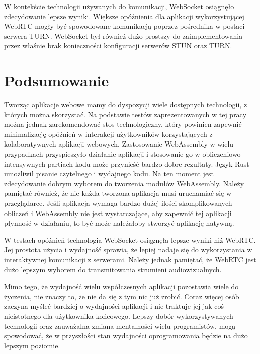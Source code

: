 \documentclass[language=polish,type=master]{aghmodern}
\begin{document}
W kontekście technologii używanych do komunikacji, WebSocket osiągnęło zdecydowanie lepsze wyniki.
Większe opóźnienia dla aplikacji wykorzystującej WebRTC mogły być spowodowane komunikacją poprzez pośrednika w postaci serwera TURN.
WebSocket był również dużo prostszy do zaimplementowania przez właśnie brak konieczności konfiguracji serwerów STUN oraz TURN.

\chapter{Podsumowanie}
Tworząc aplikacje webowe mamy do dyspozycji wiele dostępnych technologii, z których można skorzystać.
Na podstawie testów zaprezentowanych w tej pracy można jednak zarekomendować stos technologiczny, który powinien zapewnić minimalizację opóźnień w interakcji użytkowników korzystających z kolaboratywnych aplikacji webowych.
Zastosowanie WebAssembly w wielu przypadkach przyspieszyło działanie aplikacji i stosowanie go w obliczeniowo intensywnych partiach kodu może przynieść bardzo dobre rezultaty.
Język Rust umożliwił pisanie czytelnego i wydajnego kodu.
Na ten moment jest zdecydowanie dobrym wyborem do tworzenia modułów WebAssembly.
Należy pamiętać również, że nie każda tworzona aplikacja musi uruchamiać się w przeglądarce.
Jeśli aplikacja wymaga bardzo dużej ilości skomplikowanych obliczeń i WebAssembly nie jest wystarczające, aby zapewnić tej aplikacji płynność w działaniu, to być może należałoby stworzyć aplikację natywną.

W testach opóźnień technologia WebSocket osiągnęła lepsze wyniki niż WebRTC.
Jej prostota użycia i wydajność sprawia, że lepiej nadaje się do wykorzystania w interaktywnej komunikacji z serwerami.
Należy jednak pamiętać, że WebRTC jest dużo lepszym wyborem do transmitowania strumieni audiowizualnych.

Mimo tego, że wydajność wielu współczesnych aplikacji pozostawia wiele do życzenia, nie znaczy to, że nie da się z tym nic już zrobić.
Coraz więcej osób zaczyna myśleć bardziej o wydajności aplikacji i nie traktuje jej jak coś nieistotnego dla użytkownika końcowego.
Lepszy dobór wykorzystywanych technologii oraz zauważalna zmiana mentalności wielu programistów, mogą spowodować, że w przyszłości stan wydajności oprogramowania będzie na dużo lepszym poziomie.


\backmatter

\cleardoublepage
\renewcommand\listoflistingscaption{Spis listingów}
\listoflistings

\cleardoublepage
\listoffigures

\cleardoublepage
\printbibliography
\end{document}
